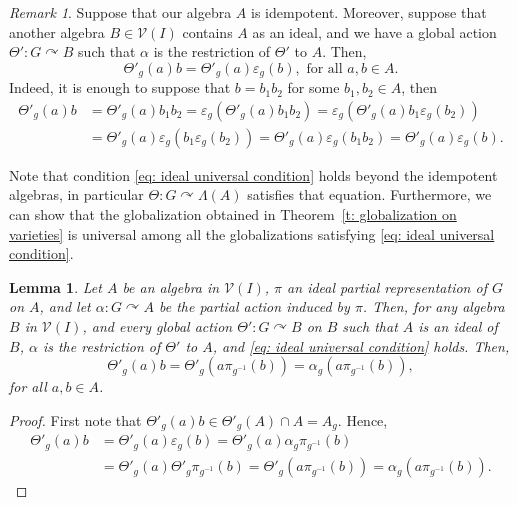 \documentclass[11pt]{amsart}
\numberwithin{equation}{section}
\newtheorem{lemma}[theorem]{Lemma}
\theoremstyle{definition}
\theoremstyle{remark}
\newtheorem{remark}[theorem]{Remark}
\begin{document}
\begin{remark}\label{r: about universal condition}
    Suppose that our algebra \(A\) is idempotent.
    Moreover, suppose that another algebra \(B \in \mathcal{V}(I)\) contains \(A\) as an ideal, and we have a global action \(\Theta': G \curvearrowright B\) such that \(\alpha\) is the restriction of \(\Theta'\) to \(A\). 
    Then,
    \begin{equation}\label{eq: ideal universal condition}
        \Theta'_g(a)b = \Theta'_{g}(a)\varepsilon_g(b), \text{ for all }a,b \in A.
    \end{equation}
    Indeed, it is enough to suppose that \(b= b_1 b_2\) for some \(b_1,b_2 \in A\), then
    \begin{align*}
        \Theta'_g(a)b
        &= \Theta'_g(a)b_1 b_2
        = \varepsilon_{g}(\Theta'_{g}(a) b_1 b_2)
        = \varepsilon_{g}(\Theta'_{g}(a)b_1 \varepsilon_{g}(b_2)) \\
        &= \Theta'_{g}(a) \varepsilon_{g}(b_1 \varepsilon_{g}(b_{2}))
        = \Theta'_{g}(a) \varepsilon_{g}(b_1b_{2})
        = \Theta'_{g}(a) \varepsilon_{g}(b).
    \end{align*}
\end{remark}

Note that condition \eqref{eq: ideal universal condition} holds beyond the idempotent algebras, in particular \(\Theta: G \curvearrowright \Lambda(A)\) satisfies that equation.
Furthermore, we can show that the globalization obtained in Theorem~\ref{t: globalization on varieties} is universal among all the globalizations satisfying \eqref{eq: ideal universal condition}.

\begin{lemma} \label{l: basic computation for globalizations}
    Let \(A\) be an algebra in \(\mathcal{V}(I)\), \(\pi\)  an ideal  partial representation  of \(G\) on \(A\), and let \(\alpha: G \curvearrowright A\) be the partial action induced by \(\pi\).  
    Then, for any algebra \(B\) in \(\mathcal{V}(I)\), and every  global action \(\Theta': G \curvearrowright B\)  on \(B\) such that \(A\) is an ideal of \(B\), \(\alpha\) is the restriction of \(\Theta'\) to \(A\),
    and \eqref{eq: ideal universal condition} holds.
    Then,
    \[
        \Theta'_g(a)b = \Theta'_g(a \pi_{g^{-1}}(b)) = \alpha_g(a \pi_{g^{-1}}(b)),
    \]
    for all \(a,b \in A\).
\end{lemma}
\begin{proof}
    First note that \(\Theta'_g(a)b \in \Theta'_g(A)\cap A= A_g\).
    Hence,
    \begin{align*}
        \Theta'_{g}(a)b 
        &= \Theta'_{g}(a) \varepsilon_{g} (b)
        = \Theta'_{g}(a) \alpha_{g} \pi_{g^{-1}} (b) \\
        &= \Theta'_{g}(a) \Theta'_{g} \pi_{g^{-1}} (b)
        = \Theta'_{g}(a \pi_{g^{-1}} (b))
        = \alpha_{g}(a \pi_{g^{-1}} (b)).
    \end{align*}
\end{proof}
\end{document}
